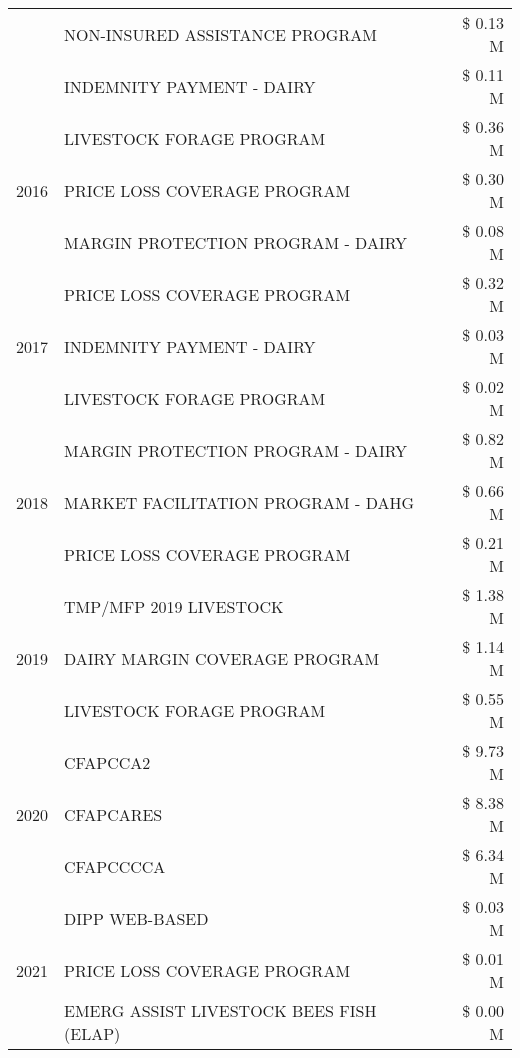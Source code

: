 \begin{tabular}{llr}
 & NON-INSURED ASSISTANCE PROGRAM & \$ 0.13 M \\
 & INDEMNITY PAYMENT - DAIRY & \$ 0.11 M \\
\cline{1-3}
\multirow[t]{3}{*}{2016} & LIVESTOCK FORAGE PROGRAM & \$ 0.36 M \\
 & PRICE LOSS COVERAGE PROGRAM & \$ 0.30 M \\
 & MARGIN PROTECTION PROGRAM - DAIRY & \$ 0.08 M \\
\cline{1-3}
\multirow[t]{3}{*}{2017} & PRICE LOSS COVERAGE PROGRAM & \$ 0.32 M \\
 & INDEMNITY PAYMENT - DAIRY & \$ 0.03 M \\
 & LIVESTOCK FORAGE PROGRAM & \$ 0.02 M \\
\cline{1-3}
\multirow[t]{3}{*}{2018} & MARGIN PROTECTION PROGRAM - DAIRY & \$ 0.82 M \\
 & MARKET FACILITATION PROGRAM - DAHG & \$ 0.66 M \\
 & PRICE LOSS COVERAGE PROGRAM & \$ 0.21 M \\
\cline{1-3}
\multirow[t]{3}{*}{2019} & TMP/MFP 2019 LIVESTOCK & \$ 1.38 M \\
 & DAIRY MARGIN COVERAGE PROGRAM & \$ 1.14 M \\
 & LIVESTOCK FORAGE PROGRAM & \$ 0.55 M \\
\cline{1-3}
\multirow[t]{3}{*}{2020} & CFAPCCA2 & \$ 9.73 M \\
 & CFAPCARES & \$ 8.38 M \\
 & CFAPCCCCA & \$ 6.34 M \\
\cline{1-3}
\multirow[t]{3}{*}{2021} & DIPP WEB-BASED & \$ 0.03 M \\
 & PRICE LOSS COVERAGE PROGRAM & \$ 0.01 M \\
 & EMERG ASSIST LIVESTOCK BEES FISH (ELAP) & \$ 0.00 M \\
\cline{1-3}
\bottomrule
\end{tabular}
